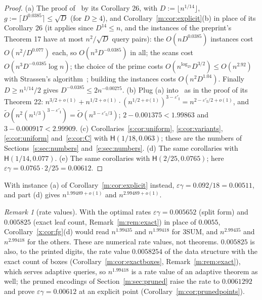 \documentclass[11pt]{article}
\theoremstyle{definition}
\theoremstyle{remark}
\newtheorem{remark}[theorem]{Remark}
\newcommand{\Hyp}{\mathsf{H}}
\newcommand{\EpsGammaBest}{0.00612}%
\newcommand{\HypPrunedEps}{2/25}%
\newcommand{\HypPrunedGamma}{0.0765}%
\newcommand{\EpsGammaPrunedSup}{0.0061292}%
\newcommand{\EpsGammaFullSup}{0.0058254}%
\begin{document}
\begin{proof}
(a) The proof of~\cite[Theorem 19]{ZT} by its Corollary 26, with $D:=\lfloor n^{1/14}\rfloor$, $g:=\lceil D^{0.0385}\rceil\le\sqrt D$ (for $D\ge4$), and Corollary~\ref{m:cor:explicit}(b) in place of its Corollary 26 (it applies since $D^{14}\le n$, and the instances of the preprint's Theorem 17 have at most $n^2/\sqrt D$ query pairs): the $O(nD^{0.0385})$ instances cost $O(n^2/D^{0.077})$ each, so $O(n^3D^{-0.0385})$ in all; the scans cost $O(n^3D^{-0.0385}\log n)$; the choice of the prime costs $O(n^{\log_27}D^{3/2})\le O(n^{2.92})$ with Strassen's algorithm~\cite{Str69}; building the instances costs $O(n^2D^{1.04})$. Finally $D\ge n^{1/14}/2$ gives $D^{-0.0385}\le2n^{-0.00275}$. (b) Plug (a) into~\cite[Theorem 21]{ZT} as in the proof of its Theorem 22: $n^{3/2+o(1)}+n^{1/2+o(1)}\cdot(n^{1/2+o(1)})^{3-\varepsilon'_{\mathrm I}}=n^{2-\varepsilon'_{\mathrm I}/2+o(1)}$, and $\tilde O(n^2(n^{1/3})^{3-\varepsilon'_{\mathrm I}})=\tilde O(n^{3-\varepsilon'_{\mathrm I}/3})$; $2-0.001375<1.99863$ and $3-0.000917<2.99909$. (c) Corollaries~\ref{s:cor:uniform}, \ref{s:cor:variants}, \ref{e:cor:uniform} and~\ref{e:cor:C} with $\Hyp(1/18,0.063)$; these are the numbers of Sections~\ref{s:sec:numbers} and~\ref{e:sec:numbers}. (d) The same corollaries with $\Hyp(1/14,0.077)$. (e) The same corollaries with $\Hyp(\HypPrunedEps,\HypPrunedGamma)$; here $\varepsilon\gamma=0.0765\cdot2/25=\EpsGammaBest$.
\end{proof}

With instance (a) of Corollary~\ref{m:cor:explicit} instead, $\varepsilon\gamma=0.092/18=0.00511$, and part (d) gives $n^{1.99489+o(1)}$ and $n^{2.99489+o(1)}$.

\begin{remark}[rate values]\label{x:rem:ratefg}
With the optimal rates $\varepsilon\gamma=0.005652$ (split form) and $0.005825$ (exact leaf count, Remark~\ref{m:rem:exact}) in place of $0.0055$, Corollary~\ref{x:cor:fg}(d) would read $n^{1.99435}$ and $n^{1.99418}$ for 3SUM, and $n^{2.99435}$ and $n^{2.99418}$ for the others. These are numerical rate values, not theorems.
$0.005825$ is also, to the printed digits, the rate value $\EpsGammaFullSup$ of the data structure with the exact count of boxes (Corollary~\ref{m:cor:exactboxes}, Remark~\ref{m:rem:exact}), which serves adaptive queries, so $n^{1.99418}$ is a rate value of an adaptive theorem as well; the pruned encodings of Section~\ref{m:sec:pruned} raise the rate to $\EpsGammaPrunedSup$ and prove $\varepsilon\gamma=\EpsGammaBest$ at an explicit point (Corollary~\ref{m:cor:prunedpoints}).
\end{remark}
\end{document}
